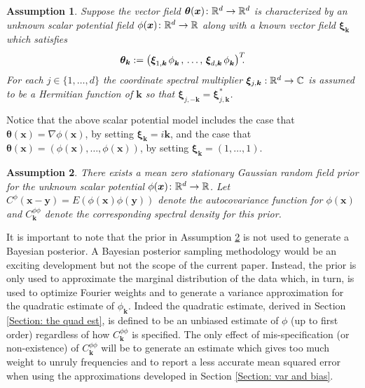\documentclass[10pt,noinfoline]{imsart}
\newtheorem{assumption}{Assumption}
\newcommand{\bs}{\boldsymbol}
\begin{document}
\begin{assumption}\label{Assumption 2}
Suppose the vector field $\bs\theta(\bs x)\colon \Bbb R^d \rightarrow \Bbb R^d$ is characterized by an unknown scalar potential field $\phi(\bs x)\colon \Bbb R^d \rightarrow \Bbb R$ along with a known vector field  $\bs \xi_{\bs k}$ which satisfies
\[
\bs\theta_{\bs k} := \big(\bs\xi^{\phantom{*}}_{1,\bs k} \hspace{.05cm}\phi_{\bs k}^{\phantom{*}}\hspace{.05cm}, \,\ldots, \, \bs \xi_{d,\bs k}^{\phantom{*}}\hspace{.05cm}\phi_{\bs k}^{\phantom{*}}\big)^T\!\!.
\]
For each $j\in\{1,\ldots, d\}$ the coordinate spectral multiplier $\bs\xi_{j,\bs k}:\Bbb R^d\rightarrow \Bbb C$ is assumed to be a Hermitian function of $\bs k$ so that $\bs\xi_{j,-\bs k}^{\phantom{*}}= \bs\xi_{j,\bs k}^*$.
\end{assumption}

Notice that the above scalar potential model includes the case that $\bs \theta(\bs x)=\nabla \phi(\bs x)$,  by setting $\bs \xi_{\bs k}=i\bs k$, and the case that $\bs \theta(\bs x) = (\phi(\bs x),\ldots, \phi(\bs x))$, by setting $\bs \xi_{\bs k}=(1,\ldots, 1)$.


\begin{assumption}\label{Assumption 3}
There exists a mean zero stationary Gaussian random field prior for the unknown scalar potential $\phi(\bs x)\colon \Bbb R^d \rightarrow \Bbb R$. Let $C^{\phi}(\bs x - \bs y)= E(\phi(\bs x)\phi(\bs y))$ denote the autocovariance function for $\phi(\bs x)$ and $C^{\phi\phi}_{\bs k}$ denote the corresponding spectral density for this prior.
\end{assumption}

It is important to note that the prior in Assumption \ref{Assumption 3} is not used to generate a Bayesian posterior. A Bayesian posterior sampling methodology would be an exciting development but not the scope of the current paper. Instead, the prior is only used to approximate the marginal distribution of the data which, in turn, is used to optimize Fourier weights and to generate a variance approximation for the quadratic estimate of $\phi_{\bs k}$. Indeed the quadratic estimate, derived in Section \ref{Section: the quad est}, is defined to be an unbiased estimate of $\phi$ (up to first order) regardless of how $C_{\bs k}^{\phi\phi}$ is specified. The only effect of mis-specification (or non-existence) of $C_{\bs k}^{\phi\phi}$ will be to generate an estimate which gives too much weight to unruly frequencies and to report a less accurate mean squared error when using the approximations developed in Section \ref{Section: var and bias}.
\end{document}
